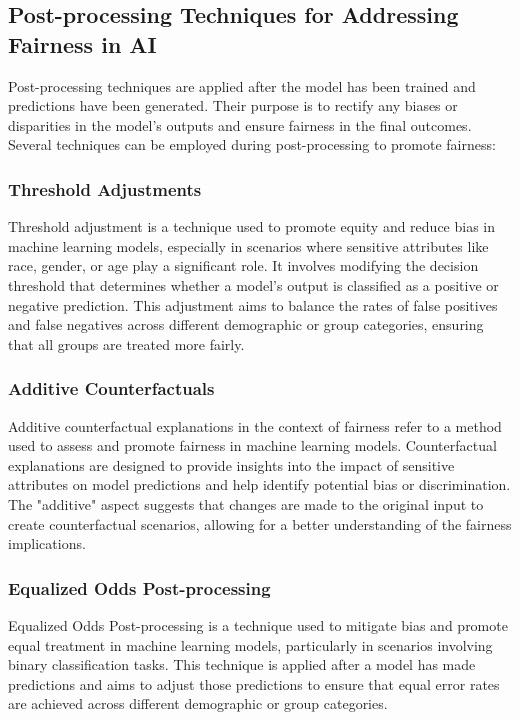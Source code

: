 \documentclass[12pt,a4paper,openright,twoside]{book}
\begin{document}
\subsection{Post-processing Techniques for Addressing Fairness in AI}

Post-processing techniques are applied after the model has been trained and predictions have been generated. Their purpose is to rectify any biases or disparities in the model's outputs and ensure fairness in the final outcomes. Several techniques can be employed during post-processing to promote fairness:

\subsubsection{Threshold Adjustments}
Threshold adjustment is a technique used to promote equity and reduce bias in machine learning models, especially in scenarios where sensitive attributes like race, gender, or age play a significant role. It involves modifying the decision threshold that determines whether a model's output is classified as a positive or negative prediction. This adjustment aims to balance the rates of false positives and false negatives across different demographic or group categories, ensuring that all groups are treated more fairly. \cite{10.1145/3447548.3467251}

\subsubsection{Additive Counterfactuals}
Additive counterfactual explanations in the context of fairness refer to a method used to assess and promote fairness in machine learning models. Counterfactual explanations are designed to provide insights into the impact of sensitive attributes on model predictions and help identify potential bias or discrimination. The "additive" aspect suggests that changes are made to the original input to create counterfactual scenarios, allowing for a better understanding of the fairness implications. \cite{NIPS2017_a486cd07}

\subsubsection{Equalized Odds Post-processing}
Equalized Odds Post-processing is a technique used to mitigate bias and promote equal treatment in machine learning models, particularly in scenarios involving binary classification tasks. This technique is applied after a model has made predictions and aims to adjust those predictions to ensure that equal error rates are achieved across different demographic or group categories. \cite{10.1145/3442188.3445902}
\end{document}
